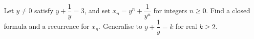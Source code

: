 Let $y\ne0$ satisfy $y+\dfrac{1}{y}=3$, and set $x_n=y^n+\dfrac{1}{y^n}$ for integers $n\ge0$. Find a closed formula and a recurrence for $x_n$. Generalise to $y+\dfrac{1}{y}=k$ for real $k\ge2$.
